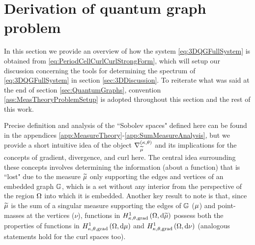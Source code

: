 \section{Derivation of quantum graph problem} \label{sec:3DSystemDerivation}
In this section we provide an overview of how the system \eqref{eq:3DQGFullSystem} is obtained from \eqref{eq:PeriodCellCurlCurlStrongForm}, which will setup our discussion concerning the tools for determining the spectrum of \eqref{eq:3DQGFullSystem} in section \ref{sec:3DDiscussion}.
To reiterate what was said at the end of section \ref{sec:QuantumGraphs}, convention \ref{ass:MeasTheoryProblemSetup} is adopted throughout this section and the rest of this work. 

Precise definition and analysis of the ``Sobolev spaces" defined here can be found in the appendices \ref{app:MeasureTheory}-\ref{app:SumMeasureAnalysis}, but we provide a short intuitive idea of the object $\nabla^{\left( \kappa, \theta \right)}_{\widetilde{\mu}}$ and its implications for the concepts of gradient, divergence, and curl here.
The central idea surrounding these concepts involves determining the information (about a function) that is ``lost" due to the measure $\widetilde{\mu}$ only supporting the edges and vertices of an embedded graph $\mathbb{G}$, which is a set without any interior from the perspective of the region $\Omega$ into which it is embedded.
Another key result to note is that, since $\widetilde{\mu}$ is the sum of a singular measure supporting the edges of $\mathbb{G}$ ($\mu$) and point-masses at the vertices ($\nu$), functions in $H^1_{\kappa,\theta,\mathrm{grad}}\left( \Omega, \mathrm{d}\widetilde{\mu} \right)$ possess both the properties of functions in $H^1_{\kappa,\theta,\mathrm{grad}}\left( \Omega, \mathrm{d}\mu \right)$ and $H^1_{\kappa,\theta,\mathrm{grad}}\left( \Omega, \mathrm{d}\nu \right)$ (analogous statements hold for the curl spaces too).

